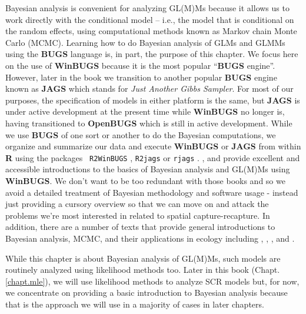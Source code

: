 Bayesian analysis is convenient for analyzing GL(M)Ms because it allows
us to work directly with the conditional model -- i.e., the model that
is conditional on the random effects, using computational methods
known as Markov chain Monte Carlo (MCMC). Learning how to do Bayesian
analysis of GLMs and GLMMs using the {\bf BUGS} language is, in part, the purpose
of this chapter. We focus here on the use of {\bf WinBUGS} because it
is the most popular ``{\bf BUGS} engine''. However, later in the book
we transition to another popular {\bf BUGS} engine known as {\bf
  JAGS} \citep{plummer:2009} which stands for {\it Just Another Gibbs
  Sampler}. For most of our purposes, the specification of models in
either platform is the same, but {\bf JAGS} is under active
development at the present time while {\bf WinBUGS} no longer is,
having transitioned to 
{\bf OpenBUGS} \citep{lunn_etal:2009} which is still in active
development.  
 While we use {\bf BUGS} of one sort or another to do the Bayesian
computations, we organize and summarize our data and execute {\bf
  WinBUGS} or {\bf JAGS} from within {\bf R} using the packages 
\mbox{\tt
  R2WinBUGS} \citep{sturtz_etal:2005}, \mbox{\tt R2jags} \citep{su_yajima:2011} or \mbox{\tt rjags} \citep{plummer:2009}.  \citet{kery:2010}, and
\citet{kery_schaub:2011} provide excellent and accessible introductions to the basics
of Bayesian analysis and GL(M)Ms using {\bf WinBUGS}.
We don't want to
be too redundant with those books and so we avoid a detailed
treatment of Bayesian methodology and software usage - instead just providing a cursory
overview so that we can move on and attack the problems we're most
interested in related to spatial capture-recapture.  In addition,
there are a number of texts that provide general introductions to
Bayesian analysis, MCMC, and their applications in ecology including
\citet{mccarthy:2007}, \citet{kery:2010}, \citet{link_barker:2010}, and
\citet{king_etal:2008}.


While this chapter is about Bayesian analysis of GL(M)Ms, such models
are routinely analyzed using likelihood methods too.
Later in
this book (Chapt. \ref{chapt.mle}), we will use likelihood methods to analyze SCR models but,
for now, we concentrate on providing a basic introduction to Bayesian
analysis because that is the approach we will use in a majority of
cases in later chapters.


